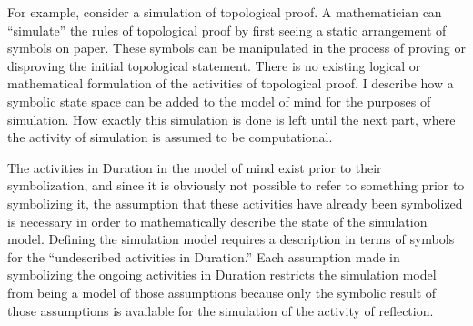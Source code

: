 For example, consider a simulation of topological proof.  A
mathematician can ``simulate'' the rules of topological proof by first
seeing a static arrangement of symbols on paper.  These symbols can be
manipulated in the process of proving or disproving the initial
topological statement.  There is no existing logical or mathematical
formulation of the activities of topological proof.  I describe how a
symbolic state space can be added to the model of mind for the
purposes of simulation.  How exactly this simulation is done is left
until the next part, where the activity of simulation is assumed to be
computational.

The activities in Duration in the model of mind exist prior to their
symbolization, and since it is obviously not possible to refer to
something prior to symbolizing it, the assumption that these
activities have already been symbolized is necessary in order to
mathematically describe the state of the simulation model.  Defining
the simulation model requires a description in terms of symbols for
the ``undescribed activities in Duration.''  Each assumption made in
symbolizing the ongoing activities in Duration restricts the
simulation model from being a model of those assumptions because only
the symbolic result of those assumptions is available for the
simulation of the activity of reflection.

